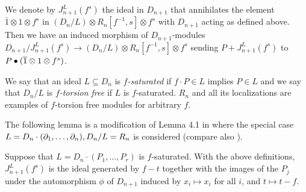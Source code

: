 \begin{definition}
We denote by $J^L_{n+1}(f^s)$ the ideal in $D_{n+1}$ that annihilates the
element $\bar 1\otimes 1\otimes f^s$ in $(D_n/L)\otimes
R_n[f^{-1},s]\otimes f^s$ with $D_{n+1}$ acting
as defined above. 
Then we have an induced morphism
of $D_{n+1}$-modules $D_{n+1}/J^L_{n+1}(f^s)\to (D_n/L)\otimes
R_n[f^{-1},s]\otimes f^s$ sending
$P+J^L_{n+1}(f^s)$ to 
$P\bullet (\overline{1}\otimes 1\otimes f^s)$. 
\end{definition}

We say that an ideal $L\subseteq D_n$ is {\em
 $f$-saturated}
 if $f\cdot
P\in L$ implies $P\in L$ and we say that $D_n/L$ is {\em $f$-torsion
free} if $L$ is $f$-saturated. 
$R_n$ and all its localizations are examples of $f$-torsion free
modules for arbitrary $f$.

The
following lemma is a modification of Lemma 4.1 in \cite{DM:M} 
where the special case
$L=D_n\cdot (\partial_1,\ldots,\partial_n), D_n/L=R_n$ is considered (compare also
\cite{DM:W1}).

\begin{lemma}
Suppose that $L=D_n\cdot (P_1,\ldots,P_r)$ is $f$-saturated.
With the above definitions, $J^L_{n+1}(f^s)$ is the
ideal generated by $f-t$ together with the images of the $P_j$ under
the automorphism $\phi$ of $D_{n+1}$ induced by $x_i\mapsto x_i$ for all
$i$, and $t \mapsto t-f$. 
\end{lemma}

